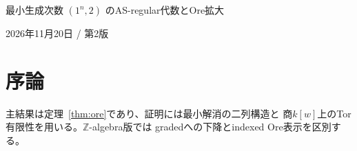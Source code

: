 \documentclass[a4paper,11pt]{ltjsarticle}
\numberwithin{equation}{section}
\theoremstyle{definition}
\begin{document}
\begin{center}
{\Large 最小生成次数 $(1^n,2)$ のAS-regular代数とOre拡大}\par
\vspace{3mm}
2026年11月20日 / 第2版
\end{center}
\begin{abstract}
最小生成次数$(1^n,2)$、AS次元$n+1$、AS添字$n+2$の次数付きAS正則代数を
次数2のOre拡大として記述する。低次元、中心拡大、反例を含む。
一般の$\mathbb Z$-algebraへのindexed Ore拡張は未完成の研究課題として区別する。
\end{abstract}
\tableofcontents
\clearpage
\section{序論}
主結果は定理~\ref{thm:ore}であり、証明には最小解消の二列構造と
商$k[w]$上のTor有限性を用いる。$\mathbb Z$-algebra版では
gradedへの下降とindexed Ore表示を区別する。







\end{document}
